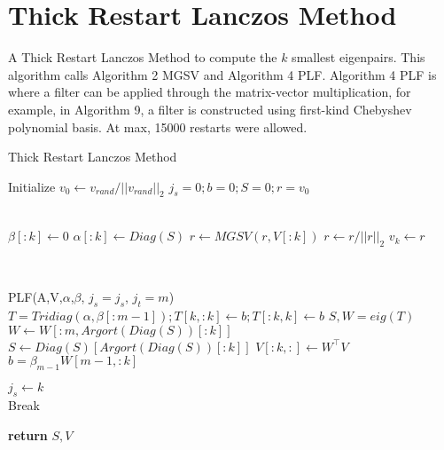 \documentclass[a4paper]{article}
\begin{document}
\pagebreak

\section{Thick Restart Lanczos Method}
A Thick Restart Lanczos Method to compute the $k$ smallest eigenpairs. This algorithm calls Algorithm 2 MGSV and Algorithm 4 PLF. Algorithm 4 PLF is where a  filter can be applied through the matrix-vector multiplication, for example, in Algorithm 9, a filter is constructed using first-kind Chebyshev polynomial basis. At max, 15000 restarts were allowed.


\begin{algorithm}
\caption{Thick Restart Lanczos Method}\label{alg:TRLM}
\begin{algorithmic}[1]
\State Initialize $v_0 \gets v_{rand}/||v_{rand}||_2 $
\State $j_s = 0; b = 0; S = 0; r = v_0$

        \\
        \State $\beta[:k] \gets 0$
        \State $\alpha[:k] \gets Diag(S)$
        \State $r \gets MGSV(r,V[:k])$
        \State $r \gets r / ||r||_2$
        \State $v_k \gets r$

        \\
        
        \State PLF(A,V,$\alpha$,$\beta$, $j_s = j_s$, $j_t = m$) 
        \\
        \State $T = Tridiag(\alpha,\beta[:m-1]); T[k,:k] \gets b; T[:k,k] \gets b$
        \State $S,W = eig(T)$
        \State $W \gets W[:m,Argort(Diag(S))[:k]]$
        \State $S \gets Diag(S)[Argort(Diag(S))[:k]]$
        \State $V[:k,:] \gets W^\top V$
        \State $b = \beta_{m-1} W[m-1, :k]$ 
        
        \State $j_s \gets k$ 
        \\
            \State Break
        \EndIf
        
        
\EndFor



\State \textbf{return} $S, V$

\EndProcedure
\end{algorithmic}
\end{algorithm}
\end{document}
